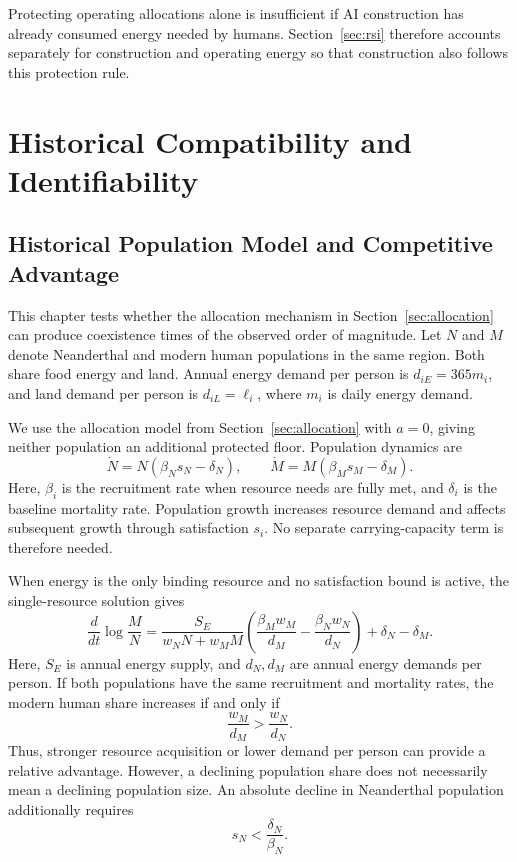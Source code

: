 \documentclass[12pt,a4paper]{article}
\theoremstyle{remark}
\begin{document}
Protecting operating allocations alone is insufficient if AI construction has already consumed energy needed by humans. Section~\ref{sec:rsi} therefore accounts separately for construction and operating energy so that construction also follows this protection rule.


\section{Historical Compatibility and Identifiability}\label{sec:history}
\subsection{Historical Population Model and Competitive Advantage}
This chapter tests whether the allocation mechanism in Section~\ref{sec:allocation} can produce coexistence times of the observed order of magnitude. Let $N$ and $M$ denote Neanderthal and modern human populations in the same region. Both share food energy and land. Annual energy demand per person is $d_{iE}=365m_i$, and land demand per person is $d_{iL}=\ell_i$, where $m_i$ is daily energy demand.

We use the allocation model from Section~\ref{sec:allocation} with $a=0$, giving neither population an additional protected floor. Population dynamics are
\begin{equation}\label{eq:history}
\dot N=N(\beta_Ns_N-\delta_N),\qquad
\dot M=M(\beta_Ms_M-\delta_M).
\end{equation}
Here, $\beta_i$ is the recruitment rate when resource needs are fully met, and $\delta_i$ is the baseline mortality rate. Population growth increases resource demand and affects subsequent growth through satisfaction $s_i$. No separate carrying-capacity term is therefore needed.

When energy is the only binding resource and no satisfaction bound is active, the single-resource solution gives
\begin{equation}\label{eq:ratio}
\frac{d}{dt}\log\frac{M}{N}
=\frac{S_E}{w_NN+w_MM}\left(\frac{\beta_Mw_M}{d_M}-\frac{\beta_Nw_N}{d_N}\right)
+\delta_N-\delta_M.
\end{equation}
Here, $S_E$ is annual energy supply, and $d_N,d_M$ are annual energy demands per person. If both populations have the same recruitment and mortality rates, the modern human share increases if and only if
\[
\frac{w_M}{d_M}>\frac{w_N}{d_N}.
\]
Thus, stronger resource acquisition or lower demand per person can provide a relative advantage. However, a declining population share does not necessarily mean a declining population size. An absolute decline in Neanderthal population additionally requires
\[
s_N<\frac{\delta_N}{\beta_N}.
\]
\end{document}
